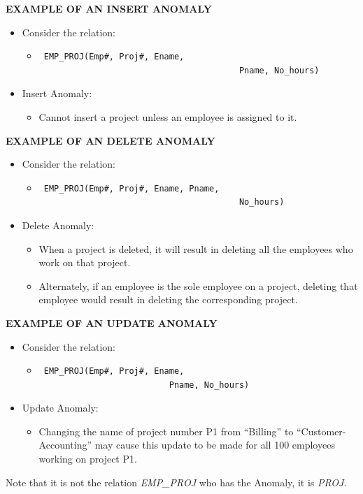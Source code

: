 \begin{multicols}{2}
\textbf{EXAMPLE OF AN INSERT ANOMALY}
\begin{itemize}
    \item Consider the relation:
    \begin{itemize}
        \item  \begin{verbatim} EMP_PROJ(Emp#, Proj#, Ename,
                                        Pname, No_hours) \end{verbatim}
    \end{itemize}
    \item Insert Anomaly:
    \begin{itemize}
        \item Cannot insert a project unless an employee is
            assigned to it.
    \end{itemize}
\end{itemize}


\textbf{EXAMPLE OF AN DELETE ANOMALY}
\begin{itemize}
    \item Consider the relation:
    \begin{itemize}
        \item  \begin{verbatim} EMP_PROJ(Emp#, Proj#, Ename, Pname,
                                        No_hours) \end{verbatim}
    \end{itemize}
    \item Delete Anomaly:
    \begin{itemize}
        \item When a project is deleted, it will result in deleting
            all the employees who work on that project.
        \item Alternately, if an employee is the sole employee
            on a project, deleting that employee would result in
            deleting the corresponding project.
    \end{itemize}
\end{itemize}


\textbf{EXAMPLE OF AN UPDATE ANOMALY}
\begin{itemize}
    \item Consider the relation:
    \begin{itemize}
    \item
\begin{verbatim} EMP_PROJ(Emp#, Proj#, Ename,
                          Pname, No_hours) \end{verbatim}
    \end{itemize}
    \item Update Anomaly:
    \begin{itemize}
        \item Changing the name of project number P1 from
            “Billing” to “Customer-Accounting” may cause this
            update to be made for all 100 employees working
            on project P1.
    \end{itemize}
\end{itemize}
Note that it is not the relation \textit{EMP\_PROJ}
who has the Anomaly, it is \textit{PROJ}.


\end{multicols}
